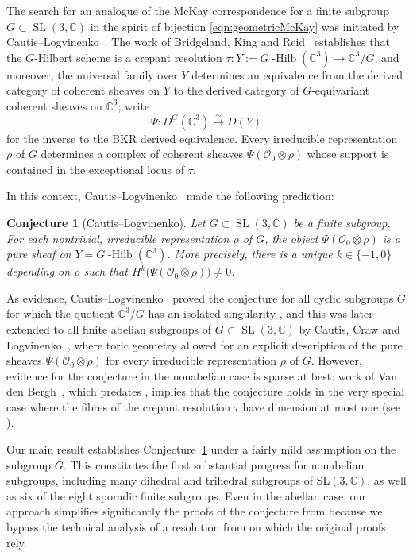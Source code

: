 \documentclass[11pt,reqno]{amsart}
\numberwithin{equation}{section}
\newtheorem{conjecture}[theorem]{Conjecture}
\theoremstyle{definition}
\newcommand{\ghilb}{\ensuremath{G}\operatorname{-Hilb}}
\newcommand{\0}{\operatorname{0}}
\newcommand{\SL}{\operatorname{SL}}
\begin{document}
    The search for an analogue of the McKay correspondence for a finite subgroup $G\subset \SL(3,\mathbb{C})$ in the spirit of bijection \eqref{eqn:geometricMcKay} was initiated by Cautis--Logvinenko~\cite{CL09}. The work of Bridgeland, King and Reid~\cite{BKR01} establishes that the $G$-Hilbert scheme is a crepant resolution $\tau\colon Y:= \ghilb(\mathbb{C}^3)\to \mathbb{C}^3/G$, and moreover, the universal family over $Y$ determines an equivalence from the derived category of coherent sheaves on $Y$ to the derived category of $G$-equivariant coherent sheaves on $\mathbb{C}^3$; write
 \[
 \Psi\colon D^G(\mathbb{C}^3)\stackrel{\sim}{\longrightarrow} D(Y)
 \]
 for the inverse to the BKR derived equivalence. Every irreducible representation $\rho$ of $G$ determines a complex of coherent sheaves $\Psi(\mathcal{O}_0\otimes \rho)$ whose support is contained in the exceptional locus of $\tau$.  

 In this context, Cautis--Logvinenko~\cite[Conjecture~1.2]{CL09} made the following prediction:

 \begin{conjecture}[Cautis--Logvinenko]
 \label{conj:CLintro}
  Let $G\subset \SL(3,\mathbb{C})$ be a finite subgroup. For each nontrivial, irreducible representation $\rho$ of $G$, the object $\Psi(\mathcal{O}_0\otimes \rho)$ is a pure sheaf on $Y=\ghilb(\mathbb{C}^3)$. More precisely, there is a unique $k\in \{-1,0\}$ depending on $\rho$ such that $H^{k}\big(\Psi(\mathcal{O}_0\otimes \rho)\big)\neq 0$.
 \end{conjecture}
    
   As evidence, Cautis--Logvinenko~\cite[Theorem~1.1]{CL09} proved the conjecture for all cyclic subgroups $G$ for which the quotient  $\mathbb{C}^3/G$ has an isolated singularity \cite{CL14}, and this was later extended to all finite abelian subgroups of $G\subset \SL(3,\mathbb{C})$ %
   by Cautis, Craw and Logvinenko~\cite{CCL17}, where toric geometry allowed for an explicit description of the pure sheaves $\Psi(\mathcal{O}_0\otimes \rho)$ for every irreducible representation $\rho$ of $G$. However, evidence for the conjecture in the nonabelian case is sparse at best: work of Van den Bergh~\cite{VdB04Duke}, which predates \cite{CL09}, implies that the conjecture holds in the very special case where the fibres of the crepant resolution $\tau$ have dimension at most one (see \cite[Example~4.6]{C21}).


   \medskip
   
 Our main result establishes Conjecture~\ref{conj:CLintro} 
 under a fairly mild assumption on the subgroup $G$. This constitutes the first substantial progress for nonabelian subgroups, including many dihedral and trihedral subgroups of $\mathrm{SL}(3,\mathbb{C})$, as well as six of the eight sporadic finite subgroups. Even in the abelian case, our approach simplifies significantly the proofs of the conjecture from \cite{CCL17, CL09} because we bypass the technical analysis of a resolution from \cite{CQV15} on which the original proofs rely.
 
\end{document}
